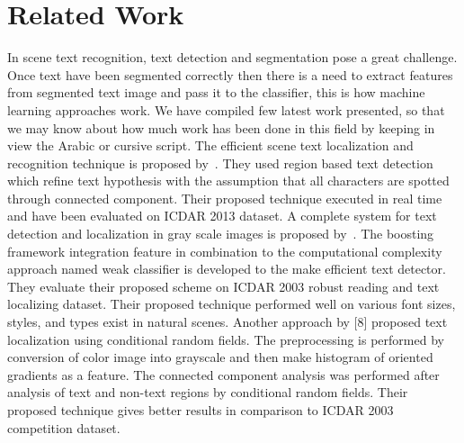 \documentclass[conference]{IEEEtran}
\begin{document}
\section{Related Work}
In scene text recognition, text detection and segmentation pose a great challenge. 
Once text have been segmented correctly then there is a need to extract features from segmented text image and pass it to the classifier, this is how machine learning approaches work. 
We have compiled few latest work presented, so that we may know about how much work has been done in this field by keeping in view the Arabic or cursive script.
The efficient scene text localization and recognition technique is proposed by~\cite{es}.
They used region based text  detection which refine text hypothesis with the assumption that all characters are spotted through connected component. Their proposed technique executed in real time and have been evaluated on ICDAR 2013 dataset. A complete system for text detection and localization in gray scale images is proposed by~\cite{td}.  
The boosting framework integration feature in combination to the computational complexity approach named weak classifier is developed to the make efficient text detector. 
They evaluate their proposed scheme on ICDAR 2003 robust reading and text localizing dataset. 
Their proposed technique performed well on various font sizes, styles, and types exist in natural scenes. Another approach by [8] proposed text localization using conditional random fields. The preprocessing is performed by conversion of color image into grayscale and then make histogram of oriented gradients as a feature. The connected component analysis was performed after analysis of text and non-text regions by conditional random fields. Their proposed technique gives better results in comparison to ICDAR 2003 competition dataset. 
\end{document}
